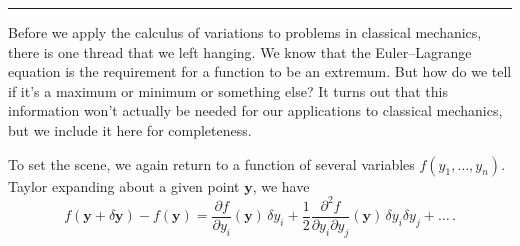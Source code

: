 \documentclass[11pt,a4paper,twoside]{article}
\newcommand{\pnum}[1]{\makebox[0pt][r]{\scriptsize\textbf{[#1]}\hspace{0.7em}}}
\begin{document}
\par\vspace{0.6em}\hrule\vspace{0.8em}

\noindent\pnum{43}Before we apply the calculus of variations to problems in classical mechanics, there is one thread that we left hanging. We know that the Euler--Lagrange equation is the requirement for a function to be an extremum. But how do we tell if it's a maximum or minimum or something else? It turns out that
this information won't actually be needed for our applications to classical mechanics, but we include it here for completeness.

\noindent\pnum{44}To set the scene, we again return to a function of several variables $f(y_1,\ldots,y_n)$. Taylor expanding about a given point $\mathbf{y}$, we have
\begin{equation}
    f(\mathbf{y}+\delta\mathbf{y})-f(\mathbf{y})
    =\frac{\partial f}{\partial y_i}(\mathbf{y})\,\delta y_i
    +\frac12\frac{\partial^2 f}{\partial y_i\partial y_j}(\mathbf{y})\,\delta y_i\delta y_j+\ldots\,.
    \tag{7.28}
\end{equation}
\end{document}
